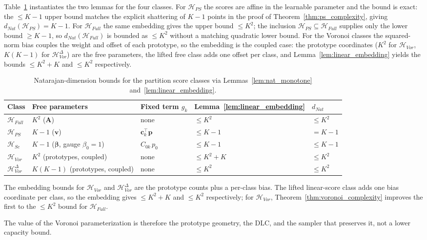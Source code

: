 Table~\ref{tab:partition_natarajan} instantiates the two lemmas for the four classes. For $\mathcal{H}_{PS}$ the scores are affine in the learnable parameter and the bound is exact: the $\leq K-1$ upper bound matches the explicit shattering of $K-1$ points in the proof of Theorem~\ref{thm:ps_complexity}, giving $d_{Nat}(\mathcal{H}_{PS}) = K-1$. For $\mathcal{H}_{Full}$ the same embedding gives the upper bound $\leq K^2$; the inclusion $\mathcal{H}_{PS} \subseteq \mathcal{H}_{Full}$ supplies only the lower bound $\geq K-1$, so $d_{Nat}(\mathcal{H}_{Full})$ is bounded as $\leq K^2$ without a matching quadratic lower bound. For the Voronoi classes the squared-norm bias couples the weight and offset of each prototype, so the embedding is the coupled case: the prototype coordinates ($K^2$ for $\mathcal{H}_{Vor}$, $K(K-1)$ for $\mathcal{H}_{Vor}^{\Delta}$) are the free parameters, the lifted free class adds one offset per class, and Lemma~\ref{lem:linear_embedding} yields the bounds $\leq K^2+K$ and $\leq K^2$ respectively.

\begin{table}[h]
    \centering
    \begin{tabular}{@{}lllll@{}}
        \toprule
        Class & Free parameters & Fixed term $g_k$ & Lemma~\ref{lem:linear_embedding} & $d_{Nat}$ \\
        \midrule
        $\mathcal{H}_{Full}$ & $K^2$ ($\mathbf{A}$) & none & $\leq K^2$ & $\leq K^2$ \\
        $\mathcal{H}_{PS}$ & $K-1$ ($\mathbf{v}$) & $\mathbf{c}_k^\top \mathbf{p}$ & $\leq K-1$ & $= K-1$ \\
        $\mathcal{H}_{Sc}$ & $K-1$ ($\boldsymbol{\beta}$, gauge $\beta_0{=}1$) & $C_{0k}\,p_0$ & $\leq K-1$ & $\leq K-1$ \\
        $\mathcal{H}_{Vor}$ & $K^2$ (prototypes, coupled) & none & $\leq K^2 + K$ & $\leq K^2$ \\
        $\mathcal{H}_{Vor}^{\Delta}$ & $K(K-1)$ (prototypes, coupled) & none & $\leq K^2$ & $\leq K^2$ \\
        \bottomrule
    \end{tabular}
    \caption{Natarajan-dimension bounds for the partition score classes via Lemmas~\ref{lem:nat_monotone} and~\ref{lem:linear_embedding}.}\label{tab:partition_natarajan}
\end{table}

\begin{proposition}\label{rem:voronoi_embedding_bounds}
    The embedding bounds for $\mathcal{H}_{Vor}$ and $\mathcal{H}_{Vor}^{\Delta}$ are the prototype counts plus a per-class bias. The lifted linear-score class adds one bias coordinate per class, so the embedding gives $\leq K^2 + K$ and $\leq K^2$ respectively; for $\mathcal{H}_{Vor}$, Theorem~\ref{thm:voronoi_complexity} improves the first to the $\leq K^2$ bound for $\mathcal{H}_{Full}$.
\end{proposition}
The value of the Voronoi parameterization is therefore the prototype geometry, the DLC, and the sampler that preserves it, not a lower capacity bound.
